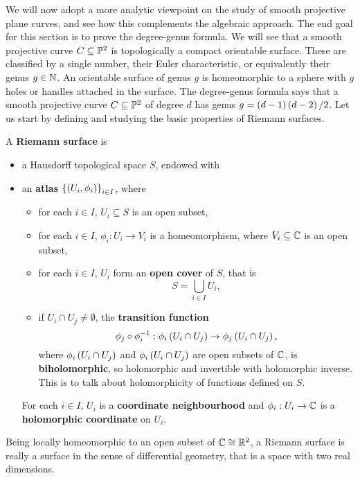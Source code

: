 We will now adopt a more analytic viewpoint on the study of smooth projective plane curves, and see how this complements the algebraic approach. The end goal for this section is to prove the degree-genus formula. We will see that a smooth projective curve $ C \subseteq \P^2 $ is topologically a compact orientable surface. These are classified by a single number, their Euler characteristic, or equivalently their genus $ g \in \N $. An orientable surface of genus $ g $ is homeomorphic to a sphere with $ g $ holes or handles attached in the surface. The degree-genus formula says that a smooth projective curve $ C \subseteq \P^2 $ of degree $ d $ has genus $ g = \rb{d - 1}\rb{d - 2} / 2 $. Let us start by defining and studying the basic properties of Riemann surfaces.

\begin{definition}
\label{def:15.1}
A \textbf{Riemann surface} is
\begin{itemize}
\item a Hausdorff topological space $ S $, endowed with
\item an \textbf{atlas} $ \cb{\rb{U_i, \phi_i}}_{i \in I} $, where
\begin{itemize}
\item for each $ i \in I $, $ U_i \subseteq S $ is an open subset,
\item for each $ i \in I $, $ \phi_i : U_i \to V_i $ is a homeomorphism, where $ V_i \subseteq \C $ is an open subset,
\item for each $ i \in I $, $ U_i $ form an \textbf{open cover} of $ S $, that is
$$ S = \bigcup_{i \in I} U_i, $$
\item if $ U_i \cap U_j \ne \emptyset $, the \textbf{transition function}
$$ \phi_j \circ \phi_i^{-1} : \phi_i\rb{U_i \cap U_j} \to \phi_j\rb{U_i \cap U_j}, $$
where $ \phi_i\rb{U_i \cap U_j} $ and $ \phi_i\rb{U_i \cap U_j} $ are open subsets of $ \C $, is \textbf{biholomorphic}, so holomorphic and invertible with holomorphic inverse. This is to talk about holomorphicity of functions defined on $ S $.
\end{itemize}
For each $ i \in I $, $ U_i $ is a \textbf{coordinate neighbourhood} and $ \phi_i : U_i \to \C $ is a \textbf{holomorphic coordinate} on $ U_i $.
\end{itemize}
\end{definition}

\begin{remark}
Being locally homeomorphic to an open subset of $ \C \cong \R^2 $, a Riemann surface is really a surface in the sense of differential geometry, that is a space with two real dimensions.
\end{remark}

